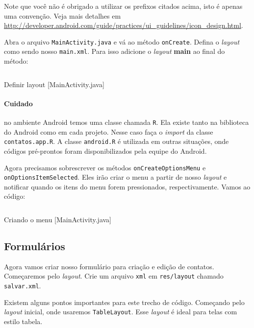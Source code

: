 Note que você não é obrigado a utilizar os prefixos citados acima, isto
é apenas uma convenção. Veja mais detalhes em
\url{http://developer.android.com/guide/practices/ui_guidelines/icon_design.html}.

Abra o arquivo \texttt{MainActivity.java} e vá ao método
\texttt{onCreate}. Defina o \emph{layout} como sendo nosso
\texttt{main.xml}. Para isso adicione o \emph{layout} \textbf{main} ao
final do método:

\begin{listing}[H]
  \inputminted[linenos=true,frame=bottomline,tabsize=3]{ java }{ source/MainActivity-1.java }
  \caption{Definir layout [MainActivity.java]}
\end{listing}

\paragraph{Cuidado \label{par:r}}

no ambiente Android temos uma classe chamada \texttt{R}. Ela existe
tanto na biblioteca do Android como em cada projeto. Nesse caso faça o
\emph{import} da classe \texttt{contatos.app.R}. A classe
\texttt{android.R} é utilizada em outras situações, onde códigos
pré-prontos foram disponibilizados pela equipe do Android.

Agora precisamos sobrescrever os métodos \texttt{onCreateOptionsMenu} e
\texttt{onOptionsItemSelected}. Eles irão criar o menu a partir de nosso
\emph{layout} e notificar quando os itens do menu forem pressionados,
respectivamente. Vamos ao código:

\begin{listing}[H]
  \inputminted[linenos=true,frame=bottomline,tabsize=3]{ java }{ source/MainActivity-2.java }
  \caption{Criando o menu [MainActivity.java]}
\end{listing}

\subsection{Formulários}

Agora vamos criar nosso formulário para criação e edição de contatos.
Começaremos pelo \emph{layout}. Crie um arquivo \texttt{xml} em
\texttt{res/layout} chamado \texttt{salvar.xml}.

Existem alguns pontos importantes para este trecho de código. Começando
pelo \emph{layout} inicial, onde usaremos \texttt{TableLayout}. Esse
\emph{layout} é ideal para telas com estilo tabela.


